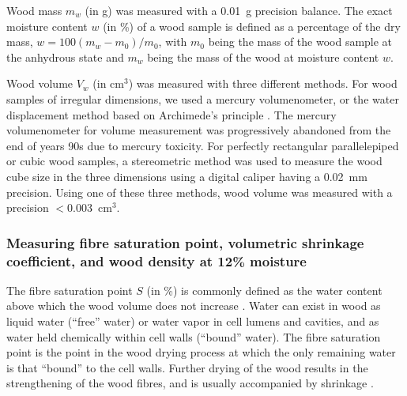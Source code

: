 \documentclass[a4paper, 12pt, leqno, dvipsnames]{article}\usepackage[]{graphicx}\usepackage[]{color}
\begin{document}
Wood mass $m_w$ (in g) was measured with a 0.01~g precision balance. The exact moisture content $w$ (in \%) of a wood sample is defined as a percentage of the dry mass, $w=100(m_w-m_0)/m_0$, with $m_0$ being the mass of the wood sample at the anhydrous state and $m_w$ being the mass of the wood at moisture content $w$. 

Wood volume $V_w$ (in cm$^3$) was measured with three different methods. For wood samples of irregular dimensions, we used a mercury volumenometer, or the water displacement method based on Archimede's principle \citep{Williamson2010}. The mercury volumenometer for volume measurement was progressively abandoned from the end of years 90s due to mercury toxicity. For perfectly rectangular parallelepiped or cubic wood samples, a stereometric method was used to measure the wood cube size in the three dimensions using a digital caliper having a 0.02~mm precision. Using one of these three methods, wood volume was measured with a precision $<$0.003~cm$^3$.

\subsubsection{Measuring fibre saturation point, volumetric shrinkage coefficient, and wood density at 12\% moisture}

The fibre saturation point $S$ (in \%) is commonly defined as the water content above which the wood volume does not increase \citep{Skaar1988}. Water can exist in wood as liquid water (``free'' water) or water vapor in cell lumens and cavities, and as water held chemically within cell walls (``bound'' water). The fibre saturation point is the point in the wood drying process at which the only remaining water is that ``bound'' to the cell walls. Further drying of the wood results in the strengthening of the wood fibres, and is usually accompanied by shrinkage \citep{Skaar1988}.
\end{document}
